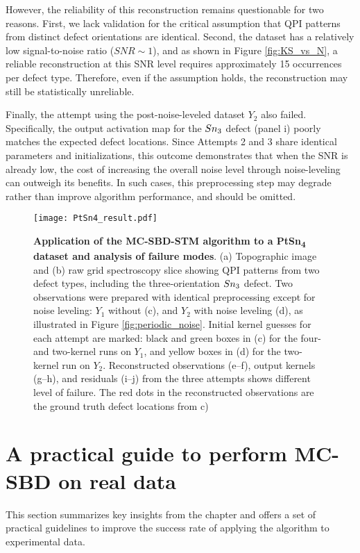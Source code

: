 However, the reliability of this reconstruction remains questionable for two reasons. First, we lack validation for the critical assumption that QPI patterns from distinct defect orientations are identical. Second, the dataset has a relatively low signal-to-noise ratio ($SNR\sim 1$), and as shown in Figure \ref{fig:KS_vs_N}, a reliable reconstruction at this SNR level requires approximately 15 occurrences per defect type. Therefore, even if the assumption holds, the reconstruction may still be statistically unreliable.

Finally, the attempt using the post-noise-leveled dataset $Y_2$ also failed. Specifically, the output activation map for the $Sn\textsubscript{3}$ defect (panel i) poorly matches the expected defect locations. Since Attempts 2 and 3 share identical parameters and initializations, this outcome demonstrates that when the SNR is already low, the cost of increasing the overall noise level through noise-leveling can outweigh its benefits. In such cases, this preprocessing step may degrade rather than improve algorithm performance, and should be omitted.

\begin{figure}
	\texttt{[image: PtSn4\_result.pdf]} 
	\centering
	\caption[\textbf{Application of the MC-SBD-STM algorithm to a PtSn\textsubscript{4} dataset and analysis of failure modes}]{\textbf{Application of the MC-SBD-STM algorithm to a PtSn\textsubscript{4} dataset and analysis of failure modes}. (a) Topographic image and (b) raw grid spectroscopy slice showing QPI patterns from two defect types, including the three-orientation $Sn\textsubscript{3}$ defect. Two observations were prepared with identical preprocessing except for noise leveling: $Y_1$ without (c), and $Y_2$ with noise leveling (d), as illustrated in Figure \ref{fig:periodic_noise}. Initial kernel guesses for each attempt are marked: black and green boxes in (c) for the four- and two-kernel runs on $Y_1$, and yellow boxes in (d) for the two-kernel run on $Y_2$. Reconstructed observations (e–f), output kernels (g–h), and residuals (i–j) from the three attempts shows different level of failure. The red dots in the reconstructed observations are the ground truth defect locations from c)}
	\label{fig:PtSn4}
\end{figure}

\section{A practical guide to perform MC-SBD on real data}
This section summarizes key insights from the chapter and offers a set of practical guidelines to improve the success rate of applying the algorithm to experimental data.

